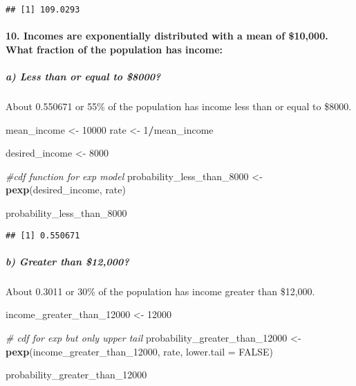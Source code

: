\documentclass[
]{article}
\newenvironment{Shaded}{\begin{snugshade}}{\end{snugshade}}
\newcommand{\AttributeTok}[1]{\textcolor[rgb]{0.13,0.29,0.53}{#1}}
\newcommand{\CommentTok}[1]{\textcolor[rgb]{0.56,0.35,0.01}{\textit{#1}}}
\newcommand{\ConstantTok}[1]{\textcolor[rgb]{0.56,0.35,0.01}{#1}}
\newcommand{\DecValTok}[1]{\textcolor[rgb]{0.00,0.00,0.81}{#1}}
\newcommand{\FunctionTok}[1]{\textcolor[rgb]{0.13,0.29,0.53}{\textbf{#1}}}
\newcommand{\NormalTok}[1]{#1}
\newcommand{\OtherTok}[1]{\textcolor[rgb]{0.56,0.35,0.01}{#1}}
\newcommand{\SpecialCharTok}[1]{\textcolor[rgb]{0.81,0.36,0.00}{\textbf{#1}}}
\begin{document}
\begin{verbatim}
## [1] 109.0293
\end{verbatim}

\hypertarget{incomes-are-exponentially-distributed-with-a-mean-of-10000.-what-fraction-of-the-population-has-income}{%
\paragraph{10. Incomes are exponentially distributed with a mean of
\$10,000. What fraction of the population has
income:}\label{incomes-are-exponentially-distributed-with-a-mean-of-10000.-what-fraction-of-the-population-has-income}}

\hypertarget{a-less-than-or-equal-to-8000}{%
\subparagraph{a) Less than or equal to
\$8000?}\label{a-less-than-or-equal-to-8000}}

About 0.550671 or 55\% of the population has income less than or equal
to \$8000.

\begin{Shaded}
\begin{Highlighting}[]
\NormalTok{mean\_income }\OtherTok{\textless{}{-}} \DecValTok{10000}
\NormalTok{rate }\OtherTok{\textless{}{-}} \DecValTok{1}\SpecialCharTok{/}\NormalTok{mean\_income}

\NormalTok{desired\_income }\OtherTok{\textless{}{-}} \DecValTok{8000}

\CommentTok{\#cdf function for exp model}
\NormalTok{probability\_less\_than\_8000 }\OtherTok{\textless{}{-}} \FunctionTok{pexp}\NormalTok{(desired\_income, rate)}

\NormalTok{probability\_less\_than\_8000}
\end{Highlighting}
\end{Shaded}

\begin{verbatim}
## [1] 0.550671
\end{verbatim}

\hypertarget{b-greater-than-12000}{%
\subparagraph{b) Greater than \$12,000?}\label{b-greater-than-12000}}

About 0.3011 or 30\% of the population has income greater than \$12,000.

\begin{Shaded}
\begin{Highlighting}[]
\NormalTok{income\_greater\_than\_12000 }\OtherTok{\textless{}{-}} \DecValTok{12000}

\CommentTok{\# cdf for exp but only upper tail}
\NormalTok{probability\_greater\_than\_12000 }\OtherTok{\textless{}{-}} \FunctionTok{pexp}\NormalTok{(income\_greater\_than\_12000, rate, }\AttributeTok{lower.tail =} \ConstantTok{FALSE}\NormalTok{)}

\NormalTok{probability\_greater\_than\_12000}
\end{Highlighting}
\end{Shaded}
\end{document}

